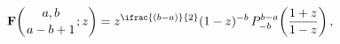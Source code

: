 \[\mathop{\mathbf{F}\/}\nolimits\!\left({a,b\atop a-b+1};z\right)=z^{\ifrac{(b-a%
)}{2}}(1-z)^{-b}\*\mathop{P^{b-a}_{-b}\/}\nolimits\!\left(\frac{1+z}{1-z}%
\right),\]